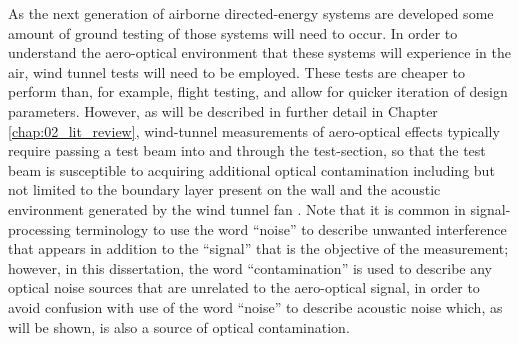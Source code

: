 As the next generation of airborne directed-energy systems are developed some amount of ground testing of those systems will need to occur.
In order to understand the aero-optical environment that these systems will experience in the air, wind tunnel tests will need to be employed.
These tests are cheaper to perform than, for example, flight testing, and allow for quicker iteration of design parameters.
However, as will be described in further detail in Chapter \ref{chap:02_lit_review}, wind-tunnel measurements of aero-optical effects typically require passing a test beam into and through the test-section, so that the test beam is susceptible to acquiring additional optical contamination including but not limited to the boundary layer present on the wall and the acoustic environment generated by the wind tunnel fan \cite{Gordeyev-2014-jcJndkHM}.
Note that it is common in signal-processing terminology to use the word “noise” to describe unwanted interference that appears in addition to the “signal” that is the objective of the measurement; however, in this dissertation, the word “contamination” is used to describe any optical noise sources that are unrelated to the aero-optical signal, in order to avoid confusion with use of the word “noise” to describe acoustic noise which, as will be shown, is also a source of optical contamination.


